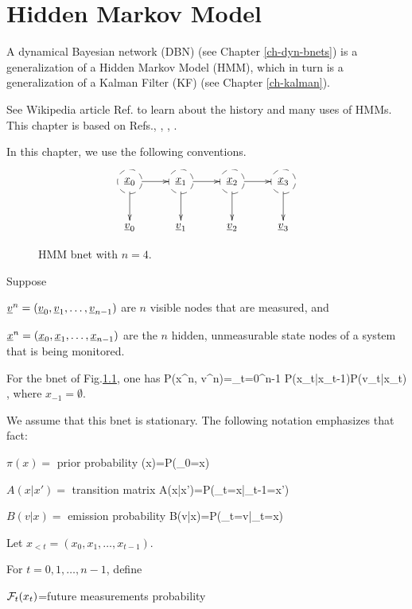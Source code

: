 \chapter{Hidden Markov Model}
\label{ch-hmm}

A dynamical Bayesian
network (DBN)  (see Chapter
\ref{ch-dyn-bnets})
is a generalization
of a
Hidden Markov Model (HMM), which
in turn is 
 a  generalization of a
Kalman Filter (KF) (see Chapter
\ref{ch-kalman}).

See Wikipedia article 
Ref.\cite{wiki-hmm} to learn 
about the history 
and many uses of HMMs. This
chapter is based on
Refs.\cite{nuel}, \cite{wiki-hmm},
\cite{wiki-viterbi}, \cite{wiki-baum}.

In this
chapter,
we use the following conventions.

\bnetInstantiations

\hiddenNodes


\begin{figure}[h!]
\centering
$$\xymatrix{
*++[F-o]{\rvx_0}\ar[d]\ar[r]&
*++[F-o]{\rvx_1}\ar[d]\ar[r]&
*++[F-o]{\rvx_2}\ar[d]\ar[r]&
*++[F-o]{\rvx_3}\ar[d]\\
\rvv_0&
\rvv_1&
\rvv_2&
\rvv_3
}$$
\caption{HMM bnet
with $n=4$.}
\label{fig-hmm}
\end{figure}

Suppose 

${\underline{v}}^n=({\underline{v}}_0, {\underline{v}}_1, 
\ldots, {\underline{v}}_{n-1})$
are $n$ visible nodes that
are measured,
and 

${\underline{x}}^n=({\underline{x}}_0, {\underline{x}}_1, 
\ldots, {\underline{x}}_{n-1})$
are the $n$ hidden, unmeasurable 
state nodes of a system
that is being monitored.



For the bnet of Fig.\ref{fig-hmm},
one has
\beq
P(x^n, v^n)=\prod_{t=0}^{n-1}
P(x_t|x_{t-1})P(v_t|x_t)
\;,
\eeq
where $x_{-1}=\emptyset$.

We assume that this bnet is stationary.
The following notation
emphasizes that fact:

$\pi(x)=$ prior probability
\beq
\pi(x)=P(\rvx_0=x)
\eeq

$A(x|x')=$ transition matrix
\beq
A(x|x')=P(\rvx_t=x|\rvx_{t-1}=x')
\eeq

$B(v|x)=$ emission probability
\beq
B(v|x)=P(\rvv_t=v|\rvx_t=x)
\eeq


Let
$x_{<t} =(x_0, x_1, \dots, x_{t-1})$.

For $t=0,1, \dots, n-1$, define

${\cal F}_t(x_t)$=future measurements probability

